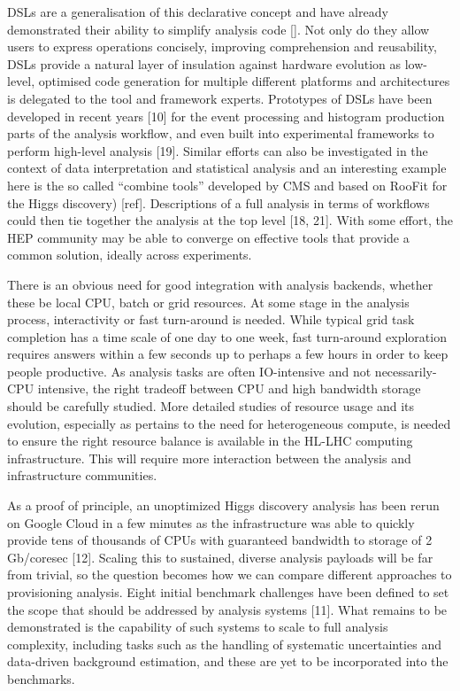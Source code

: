 \documentclass[10pt,a4paper]{article}
\begin{document}
DSLs are a generalisation of this declarative concept and have already
demonstrated their ability to simplify analysis code {[}{]}. Not only do
they allow users to express operations concisely, improving
comprehension and reusability, DSLs provide a natural layer of
insulation against hardware evolution as low-level, optimised code
generation for multiple different platforms and architectures is
delegated to the tool and framework experts. Prototypes of DSLs have
been developed in recent years {[}10{]} for the event processing and
histogram production parts of the analysis workflow, and even built into
experimental frameworks to perform high-level analysis {[}19{]}. Similar
efforts can also be investigated in the context of data interpretation
and statistical analysis and an interesting example here is the so
called ``combine tools'' developed by CMS and based on RooFit for the
Higgs discovery) {[}ref{]}. Descriptions of a full analysis in terms of
workflows could then tie together the analysis at the top level {[}18,
21{]}. With some effort, the HEP community may be able to converge on
effective tools that provide a common solution, ideally across
experiments.

There is an obvious need for good integration with analysis backends,
whether these be local CPU, batch or grid resources. At some stage in
the analysis process, interactivity or fast turn-around is needed. While
typical grid task completion has a time scale of one day to one week,
fast turn-around exploration requires answers within a few seconds up to
perhaps a few hours in order to keep people productive. As analysis
tasks are often IO-intensive and not necessarily-CPU intensive, the
right tradeoff between CPU and high bandwidth storage should be
carefully studied. More detailed studies of resource usage and its
evolution, especially as pertains to the need for heterogeneous compute,
is needed to ensure the right resource balance is available in the
HL-LHC computing infrastructure. This will require more interaction
between the analysis and infrastructure communities.

As a proof of principle, an unoptimized Higgs discovery analysis has
been rerun on Google Cloud in a few minutes as the infrastructure was
able to quickly provide tens of thousands of CPUs with guaranteed
bandwidth to storage of 2 Gb/coresec {[}12{]}. Scaling this to
sustained, diverse analysis payloads will be far from trivial, so the
question becomes how we can compare different approaches to provisioning
analysis. Eight initial benchmark challenges have been defined to set
the scope that should be addressed by analysis systems {[}11{]}. What
remains to be demonstrated is the capability of such systems to scale to
full analysis complexity, including tasks such as the handling of
systematic uncertainties and data-driven background estimation, and
these are yet to be incorporated into the benchmarks.
\end{document}
